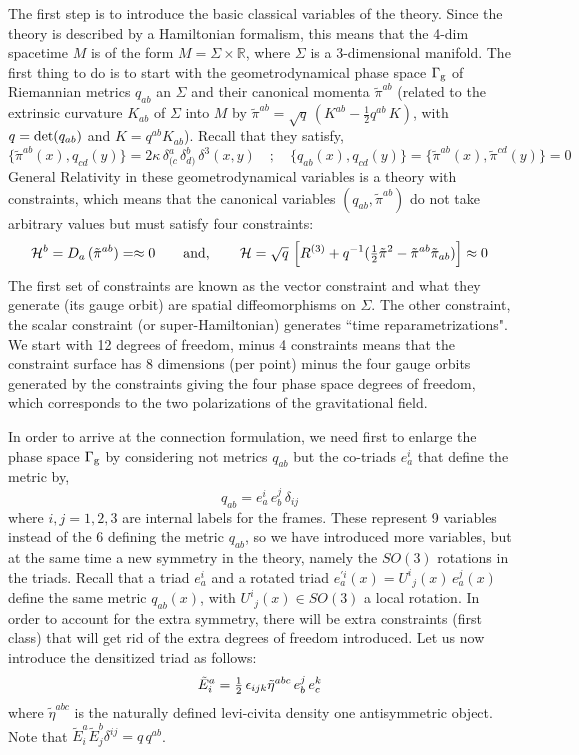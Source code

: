 \documentclass[aps,prd,tightenlines,showpacs,nofootinbib,preprint]{revtex4}
\def\be{\begin{equation}}
\def\ee{\end{equation}}
\def\tE{\tilde{E}}
\def\half{{\textstyle{1\over2}}}
\def\G{{\Gamma}}  \def\h{\hat} \def\H{{\cal H}} \def\O{{\cal O}}
\begin{document}
The first step is to introduce the basic classical variables of
the theory. Since the theory is described by a Hamiltonian
formalism, this means that the 4-dim spacetime $M$ is of the form
$M=\Sigma\times\mathbb{R}$, where $\Sigma$ is a 3-dimensional
manifold. The first thing to do is to start with the
geometrodynamical phase space $\G_{\rm g}$ of Riemannian metrics
$q_{ab}$ an $\Sigma$ and their canonical momenta
$\tilde{\pi}^{ab}$ (related to the extrinsic curvature $K_{ab}$ of
$\Sigma$ into $M$  by
$\tilde{\pi}^{ab}=\sqrt{q}\,(K^{ab}-\frac{1}{2}q^{ab}\,K)$, with
$q={\rm det}(q_{ab})$ and $K=q^{ab}K_{ab}$). Recall that they
satisfy,
%
\be
\{\tilde{\pi}^{ab}(x),q_{cd}(y)\}=2\kappa\,\delta^{a}_{(c}\,\delta^b_{d)}
\,\delta^3(x,y)\quad
;\quad
\{q_{ab}(x),q_{cd}(y)\}=\{\tilde{\pi}^{ab}(x),\tilde{\pi}^{cd}(y)\}=0
\ee
%
General Relativity in these geometrodynamical variables is a
theory with constraints, which means that the canonical variables
$(q_{ab},\tilde{\pi}^{ab})$ do not take arbitrary values but must
satisfy four constraints: \be {\cal
H}^b=D_a\,(\tilde{\pi}^{ab})=\approx 0 \qquad {\rm and},\qquad
{\cal
H}=\sqrt{q}\,\left[R^{(3)}+q^{-1}(\half{\tilde{\pi}^2}-\tilde{\pi}^{ab}
\tilde{\pi}_{ab})\right]\approx 0 \ee The first set of constraints
are known as the vector constraint and what they generate (its
gauge orbit) are spatial diffeomorphisms on $\Sigma$. The other
constraint, the scalar constraint (or super-Hamiltonian) generates
``time reparametrizations". We start with 12 degrees of freedom,
minus 4 constraints means that the constraint surface has 8
dimensions (per point) minus the four gauge orbits generated by
the constraints giving the four phase space degrees of freedom,
which corresponds to the two polarizations of the gravitational
field.

In order to arrive at the connection formulation, we need first to enlarge
the phase space $\G_{\rm g}$ by considering not metrics $q_{ab}$ but the
 co-triads $e_a^i$ that define the metric by,
\be q_{ab}=e_a^i\,e_b^j\,\delta_{ij} \ee where $i,j=1,2,3$ are
internal labels for the frames. These represent 9 variables
instead of the 6 defining the metric $q_{ab}$, so we have
introduced more variables, but  at the same time a new symmetry in
the theory, namely the $SO(3)$ rotations in the triads. Recall
that a triad $e_a^i$ and a rotated triad $e^{\prime
i}_a(x)={U^i}_j(x)\,e^j_a(x)$ define the same metric $q_{ab}(x)$,
with ${U^i}_j(x) \in SO(3)$ a local rotation. In order to account
for the extra symmetry, there will be extra constraints (first
class) that will get rid of the extra degrees of freedom
introduced. Let us now introduce the densitized triad as follows:
\be
\tilde{E}^a_i=\half\,\epsilon_{ijk}\tilde{\eta}^{abc}\,e^j_b\,e^k_c
\ee
%
where $\tilde{\eta}^{abc}$ is the naturally defined levi-civita
density one antisymmetric object. Note that
$\tE^a_i\tE^b_j\delta^{ij}=q\,q^{ab}$.
\end{document}
